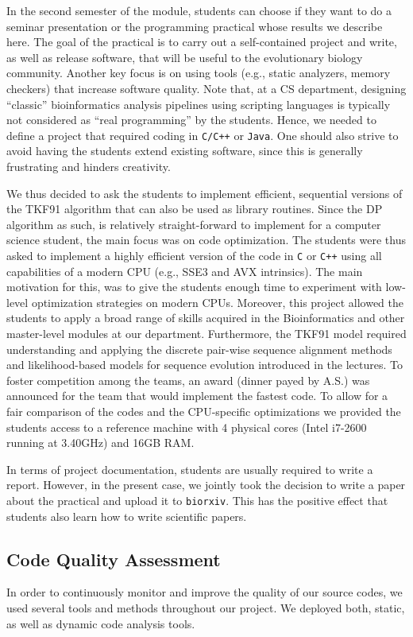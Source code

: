 \documentclass[runningheads,a4paper]{llncs}
\begin{document}
In the second semester of the module, students can choose if they want to do a seminar presentation or the programming practical whose results we describe here.
The goal of the practical is to carry out a self-contained project and write, as well as release software, that will be useful to the evolutionary biology community.
Another key focus is on using tools (e.g., static analyzers, memory checkers) that increase software quality.
Note that, at a CS department, designing ``classic'' bioinformatics analysis pipelines using scripting languages is typically not considered as ``real programming'' by the
students. Hence, we needed to define a project that required coding in \texttt{C/C++} or \texttt{Java}.
One should also strive to avoid having the students extend existing software, since
this is generally frustrating and hinders creativity.

We thus decided to ask the students to implement efficient, sequential versions of the TKF91 algorithm that can also be used as library routines.
Since the DP algorithm as such, is relatively straight-forward to implement for a computer science student, the main focus was on code optimization.
The students were thus asked to implement a highly efficient version of the code in \texttt{C} or \texttt{C++} using all capabilities of a modern CPU (e.g., SSE3 and AVX intrinsics).
The main motivation for this, was to give the students enough time to experiment with low-level optimization strategies on modern CPUs.
Moreover, this project allowed the students to apply a broad range of skills acquired in the Bioinformatics and other master-level modules at our department.
Furthermore, the TKF91 model required understanding and applying the discrete pair-wise sequence alignment methods and likelihood-based models for sequence evolution
introduced in the lectures.
To foster competition among the teams, an award (dinner payed by A.S.) was announced for the team that would implement the fastest code.
To allow for a fair comparison of the codes and the CPU-specific optimizations we provided the students access to a reference machine with
4 physical cores (Intel i7-2600 running at 3.40GHz) and 16GB RAM.

In terms of project documentation, students are usually required to write a report. However, in the present case, we jointly took the decision to write a paper
about the practical and upload it to \texttt{biorxiv}. This has the positive effect that students also learn how to write scientific papers.

\subsection{Code Quality Assessment}
In order to continuously monitor and improve the quality of our source codes, we used several tools and methods throughout our project.
We deployed both, static, as well as dynamic code analysis tools.
\end{document}
